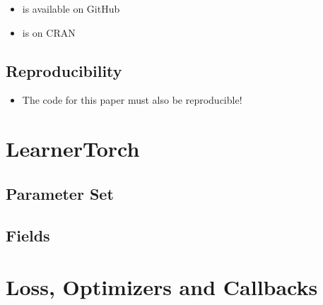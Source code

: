 \documentclass[article, nojss]{jss}
\theoremstyle{definition}
\begin{document}
\begin{itemize}
    \item is available on GitHub
    \item is on CRAN
\end{itemize}

\subsection{Reproducibility}

\begin{itemize}
    \item The code for this paper must also be reproducible!
\end{itemize}



\begin{appendix}

\section{LearnerTorch}

\subsection{Parameter Set}\label{app:learner_ps}
\subsection{Fields}\label{app:learner_fields}

\section{Loss, Optimizers and Callbacks}\label{app:loss_opts_cbs}

\end{appendix}
\end{document}
